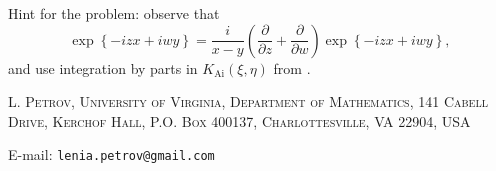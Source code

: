 \documentclass[letterpaper,11pt,oneside,reqno]{article}
\numberwithin{equation}{section}
\theoremstyle{definition}
\begin{document}
Hint for the problem: observe that
\begin{equation*}
	\exp\left\{ -i z x+iwy \right\}=\frac{i}{x-y}\left( \frac{\partial}{\partial z}+
	\frac{\partial}{\partial w}\right)\exp\left\{ -i z x+iwy \right\},
\end{equation*}
and use integration by parts in $K_{\mathrm{Ai}}(\xi,\eta)$
from .








\medskip

\textsc{L. Petrov, University of Virginia, Department of Mathematics, 141 Cabell Drive, Kerchof Hall, P.O. Box 400137, Charlottesville, VA 22904, USA}

E-mail: \texttt{lenia.petrov@gmail.com}
\end{document}
